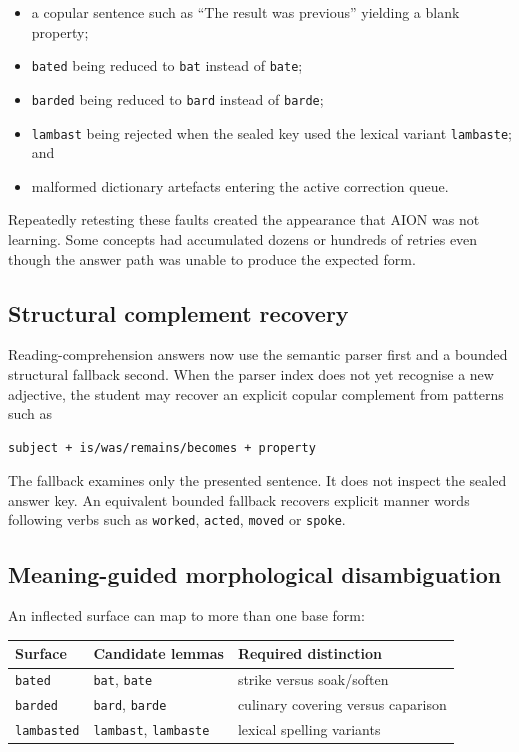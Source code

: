 \documentclass[11pt,a4paper]{article}
\begin{document}
\begin{itemize}
  \item a copular sentence such as ``The result was previous'' yielding a blank property;
  \item \texttt{bated} being reduced to \texttt{bat} instead of \texttt{bate};
  \item \texttt{barded} being reduced to \texttt{bard} instead of \texttt{barde};
  \item \texttt{lambast} being rejected when the sealed key used the lexical variant
        \texttt{lambaste}; and
  \item malformed dictionary artefacts entering the active correction queue.
\end{itemize}

Repeatedly retesting these faults created the appearance that AION was not learning. Some
concepts had accumulated dozens or hundreds of retries even though the answer path was unable to
produce the expected form.

\subsection{Structural complement recovery}

Reading-comprehension answers now use the semantic parser first and a bounded structural fallback
second. When the parser index does not yet recognise a new adjective, the student may recover an
explicit copular complement from patterns such as

\begin{lstlisting}
subject + is/was/remains/becomes + property
\end{lstlisting}

The fallback examines only the presented sentence. It does not inspect the sealed answer key.
An equivalent bounded fallback recovers explicit manner words following verbs such as
\texttt{worked}, \texttt{acted}, \texttt{moved} or \texttt{spoke}.

\subsection{Meaning-guided morphological disambiguation}

An inflected surface can map to more than one base form:

\begin{center}
\begin{tabular}{lll}
\toprule
Surface & Candidate lemmas & Required distinction \\
\midrule
\texttt{bated} & \texttt{bat}, \texttt{bate} & strike versus soak/soften \\
\texttt{barded} & \texttt{bard}, \texttt{barde} & culinary covering versus caparison \\
\texttt{lambasted} & \texttt{lambast}, \texttt{lambaste} & lexical spelling variants \\
\bottomrule
\end{tabular}
\end{center}
\end{document}
